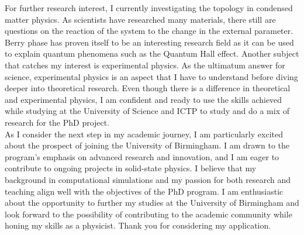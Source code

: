 \documentclass[a4paper]{article}
\begin{document}
For further research interest, I currently investigating the topology in condensed matter physics. As scientists have researched many materials, there still are questions on the reaction of the system to the change in the external parameter. Berry phase has proven itself to be an interesting research field as it can be used to explain quantum phenomena such as the Quantum Hall effect. Another subject that catches my interest is experimental physics. As the ultimatum answer for science, experimental physics is an aspect that I have to understand before diving deeper into theoretical research. Even though there is a difference in theoretical and experimental physics, I am confident and ready to use the skills achieved while studying at the University of Science and ICTP to study and do a mix of research for the PhD project.\\\null\quad 
As I consider the next step in my academic journey, I am particularly excited about the prospect of joining the University of Birmingham. I am drawn to the program's emphasis on advanced research and innovation, and I am eager to contribute to ongoing projects in solid-state physics. I believe that my background in computational simulations and my passion for both research and teaching align well with the objectives of the PhD program. I am enthusiastic about the opportunity to further my studies at the University of Birmingham and look forward to the possibility of contributing to the academic community while honing my skills as a physicist. Thank you for considering my application.
\end{document}
